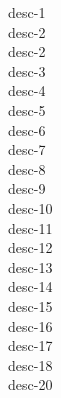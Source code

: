 




 {desc-1}
\\
 {desc-2}
\\
 {desc-2}
\\
 {desc-3}
\\
 {desc-4}
\\
 {desc-5}
\\
 {desc-6}
\\
 {desc-7}
\\
 {desc-8}
\\
 {desc-9}
\\
 {desc-10}
\\
 {desc-11}
\\
 {desc-12}
\\
 {desc-13}
\\
 {desc-14}
\\
 {desc-15}
\\
 {desc-16}
\\
 {desc-17}
\\
 {desc-18}
\\
 {desc-20}
\\


